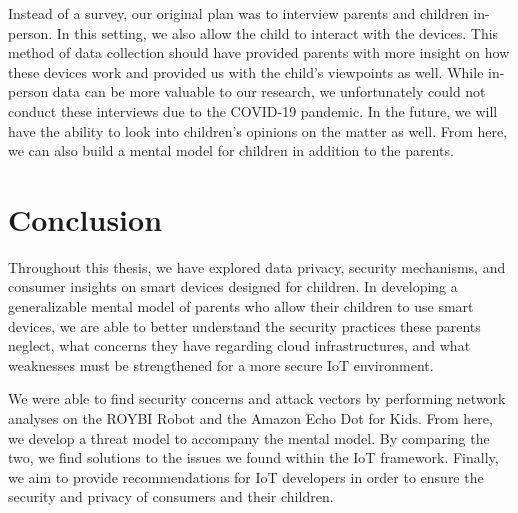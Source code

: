 \documentclass[12pt]{ucthesis}
\begin{document}
Instead of a survey, our original plan was to interview parents and children in-person. In this setting, we also allow the child to interact with the devices. This method of data collection should have provided parents with more insight on how these devices work and provided us with the child's viewpoints as well. While in-person data can be more valuable to our research, we unfortunately could not conduct these interviews due to the COVID-19 pandemic. In the future, we will have the ability to look into children's opinions on the matter as well. From here, we can also build a mental model for children in addition to the parents.


\section{Conclusion}
Throughout this thesis, we have explored data privacy, security mechanisms, and consumer insights on smart devices designed for children. In developing a generalizable mental model of parents who allow their children to use smart devices, we are able to better understand the security practices these parents neglect, what concerns they have regarding cloud infrastructures, and what weaknesses must be strengthened for a more secure IoT environment.

We were able to find security concerns and attack vectors by performing network analyses on the ROYBI Robot and the Amazon Echo Dot for Kids. From here, we develop a threat model to accompany the mental model. By comparing the two, we find solutions to the issues we found within the IoT framework. Finally, we aim to provide recommendations for IoT developers in order to ensure the security and privacy of consumers and their children.

\nocite{*}


\end{document}
